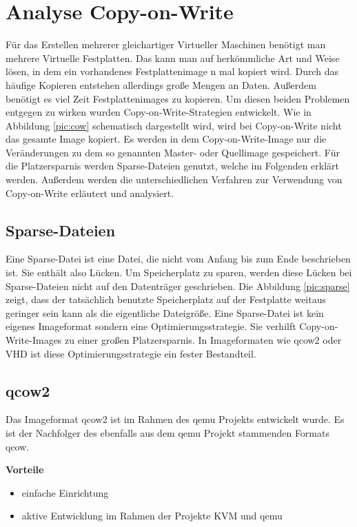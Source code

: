 \chapter{Analyse Copy-on-Write}
Für das Erstellen mehrerer gleichartiger Virtueller Maschinen benötigt man mehrere Virtuelle Festplatten. Das kann man auf herkömmliche Art und Weise lösen, in dem ein vorhandenes Festplattenimage n mal kopiert wird. Durch das häufige Kopieren entstehen allerdings große Mengen an Daten. Außerdem benötigt es viel Zeit Festplattenimages zu kopieren. Um diesen beiden Problemen entgegen zu wirken wurden Copy-on-Write-Strategien entwickelt. Wie in Abbildung \ref{pic:cow} schematisch dargestellt wird, wird bei Copy-on-Write nicht das gesamte Image kopiert. Es werden in dem Copy-on-Write-Image nur die Veränderungen zu dem so genannten Master- oder Quellimage gespeichert. Für die Platzersparnis werden Sparse-Dateien genutzt, welche im Folgenden erklärt werden. Außerdem werden die unterschiedlichen Verfahren zur Verwendung von Copy-on-Write erläutert und analysiert.


\section{Sparse-Dateien}
Eine Sparse-Datei ist eine Datei, die nicht vom Anfang bis zum Ende beschrieben ist. Sie enthält also Lücken. Um Speicherplatz zu sparen, werden diese Lücken bei Sparse-Dateien nicht auf den Datenträger geschrieben. Die Abbildung \ref{pic:sparse} zeigt, dass der tatsächlich benutzte Speicherplatz auf der Festplatte weitaus geringer sein kann als die eigentliche Dateigröße. Eine Sparse-Datei ist kein eigenes Imageformat sondern eine Optimierungsstrategie. Sie verhilft Copy-on-Write-Images zu einer großen Platzersparnis. In Imageformaten wie qcow2 oder VHD ist diese Optimierungsstrategie ein fester Bestandteil. \cite{sparse}


\section{qcow2}
Das Imageformat qcow2 ist im Rahmen des qemu Projekts entwickelt wurde. Es ist der Nachfolger des ebenfalls aus dem qemu Projekt stammenden Formats qcow. \cite{qcowmarkmc} \cite{qemuwiki}

\textbf{Vorteile}
\begin{itemize}
 \item einfache Einrichtung
 \item aktive Entwicklung im Rahmen der Projekte KVM und qemu
\end{itemize}

